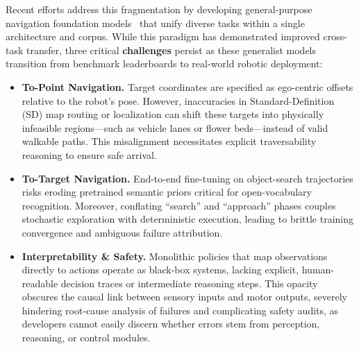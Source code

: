Recent efforts address this fragmentation by developing general-purpose navigation foundation models~\cite{zhang2025navfom,abotn0,sun2026openfrontier,chen2025socialnav} that unify diverse tasks within a single architecture and corpus. 
While this paradigm has demonstrated improved cross-task transfer, three critical \textbf{challenges} persist as these generalist models transition from benchmark leaderboards to real-world robotic deployment:
\begin{itemize}

\item \textbf{To-Point Navigation.} Target coordinates are specified as ego-centric offsets relative to the robot’s pose. However, inaccuracies in Standard-Definition (SD) map routing or localization can shift these targets into physically infeasible regions—such as vehicle lanes or flower beds—instead of valid walkable paths. This misalignment necessitates explicit traversability reasoning to ensure safe arrival.


\item \textbf{To-Target Navigation.} End-to-end fine-tuning on object-search trajectories risks eroding pretrained semantic priors critical for open-vocabulary recognition. Moreover, conflating ``search'' and ``approach'' phases couples stochastic exploration with deterministic execution, leading to brittle training convergence and ambiguous failure attribution.

\item \textbf{Interpretability \& Safety.} Monolithic policies that map observations directly to actions operate as black-box systems, lacking explicit, human-readable decision traces or intermediate reasoning steps. This opacity obscures the causal link between sensory inputs and motor outputs, severely hindering root-cause analysis of failures and complicating safety audits, as developers cannot easily discern whether errors stem from perception, reasoning, or control modules.
\end{itemize}


